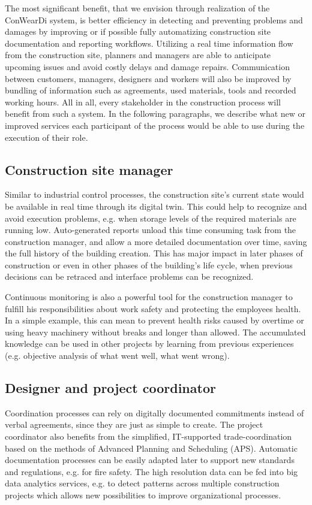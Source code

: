 The most significant benefit, that we envision through realization of the ConWearDi system, is better efficiency in detecting and preventing problems and damages by improving or if possible fully automatizing construction site documentation and reporting workflows. 
Utilizing a real time information flow from the construction site, planners and managers are able to anticipate upcoming issues and avoid costly delays and damage repairs. 
Communication between customers, managers, designers and workers will also be improved by bundling of information such as agreements, used materials, tools and recorded working hours.
All in all, every stakeholder in the construction process will benefit from such a system. 
In the following paragraphs, we describe what new or improved services each participant of the process would be able to use during the execution of their role.


\subsection{Construction site manager}
Similar to industrial control processes, the construction site's current state would be available in real time through its digital twin.
This could help to recognize and avoid execution problems, e.g. when storage levels of the required materials are running low.
Auto-generated reports unload this time consuming task from the construction manager, and allow a more detailed documentation over time, saving the full history of the building creation.
This has major impact in later phases of construction or even in other phases of the building's life cycle, when previous decisions can be retraced and interface problems can be recognized. 

Continuous monitoring is also a powerful tool for the construction manager to fulfill his responsibilities about work safety and protecting the employees health. In a simple example, this can mean to prevent health risks caused by overtime or using heavy machinery without breaks and longer than allowed.
The accumulated knowledge can be used in other projects by learning from previous experiences (e.g. objective analysis of what went well, what went wrong).

\subsection{Designer and project coordinator}
Coordination processes can rely on digitally documented commitments instead of verbal agreements, since they are just as simple to create.
The project coordinator also benefits from the simplified, IT-supported trade-coordination based on the methods of Advanced Planning and Scheduling (APS).
Automatic documentation processes can be easily adapted later to support new standards and regulations, e.g. for fire safety.
The high resolution data can be fed into big data analytics services, e.g. to detect patterns across multiple construction projects which allows new possibilities to improve organizational processes.

